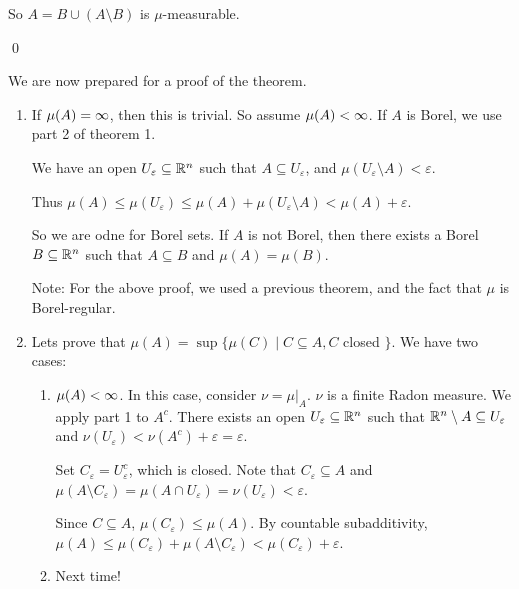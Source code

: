 \documentclass[x11names,reqno,14pt]{extarticle}
\begin{document}
So $A = B \cup (A \setminus B)$ is $\mu$-measurable. 

\qed

We are now prepared for a proof of the theorem. 

\proof

\begin{enumerate}

\item If $\mu(A)=\infty$, then this is trivial. So assume $\mu(A)<\infty$. If $A$ is Borel, we use part 2 of theorem 1. 

We have an open $U_\varepsilon\subseteq\mathbb{R}^n$ such that $A \subseteq U_\varepsilon$, and $\mu(U_\varepsilon\setminus A)<\varepsilon$. 

Thus $\mu(A)\leq\mu(U_\varepsilon)\leq\mu(A) + \mu(U_\varepsilon\setminus A) < \mu(A) + \varepsilon$. 

So we are odne for Borel sets. If $A$ is not Borel, then there exists a Borel $B \subseteq \mathbb{R}^n$ such that $A \subseteq B$ and $\mu(A) = \mu(B)$. 

Note: For the above proof, we used a previous theorem, and the fact that $\mu$ is Borel-regular. 

\item Lets prove that $\mu(A) = \sup\{\mu(C)\mid C \subseteq A, C$ closed $\}$. 
We have two cases:

\begin{enumerate}[label=(\roman*)]

\item $\mu(A)<\infty$. In this case, consider $\nu = \mu|_A$. $\nu$ is a finite Radon measure. We apply part 1 to $A^c$. There exists an open $U_\varepsilon\subseteq\mathbb{R}^n$ such that $\mathbb{R}^n\setminus A \subseteq U_\varepsilon$ and $\nu(U_\varepsilon)<\nu(A^c) + \varepsilon = \varepsilon$. 

Set $C_\varepsilon = U_\varepsilon^c$, which is closed. Note that $C_\varepsilon\subseteq A$ and $\mu(A\setminus C_\varepsilon) = \mu(A \cap U_\varepsilon)= \nu(U_\varepsilon) < \varepsilon$. 

Since $C \subseteq A$, $\mu(C_\varepsilon)\leq\mu(A)$. By countable subadditivity, $\mu(A)\leq\mu(C_\varepsilon) + \mu(A\setminus C_\varepsilon) < \mu(C_\varepsilon) + \varepsilon$. 

\item Next time!

\end{enumerate}

\end{enumerate}
\end{document}

